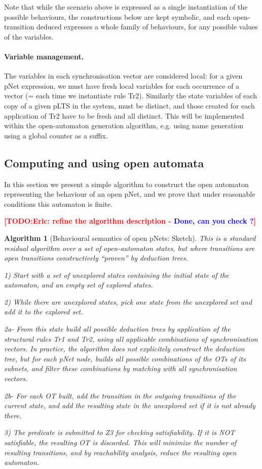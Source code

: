 \documentclass{lncs/llncs}
\newcommand{\TODO}[1]{\textcolor{red}{\textbf{[TODO:#1]}}}
\newcommand{\ERIC}[1]{\textcolor{blue}{#1}}
\newtheorem{algorithm}[theorem]{Algorithm}
\begin{document}
Note that while the scenario above is expressed as a single
instantiation of the possible behaviours, the constructions below are
kept symbolic, and each open-transition deduced expresses a whole family of
behaviours, for any possible values of the variables.

\paragraph{Variable management.}
The variables in each synchronisation vector are considered local:
for a given pNet expression, we must have fresh local variables for
each occurrence of a vector (= each time we instantiate rule
Tr2). Similarly the state variables of each copy of a
given pLTS in the system, must be distinct, and those created for each
application of Tr2 have to be fresh and all distinct. 
This will be implemented within the open-automaton generation algorithm,
e.g. using name generation using a global counter as a suffix.



\subsection{Computing and using open automata}
In this section we present a simple algorithm to construct the open
automaton representing the behaviour of an open pNet, and we prove that
under reasonable conditions this automaton is finite.

\TODO{Eric: refine the algorithm description - \ERIC{Done, can you check ?}}

\begin{algorithm}[Behavioural semantics of open pNets: Sketch]
This is a standard residual algorithm over a set of open-automaton
states, but where transitions are open transitions
constructively ``proven'' by deduction trees.

1) Start with a set of unexplored states containing the initial state
of the automaton, and an empty set of explored states.

2) While there are unexplored states, pick one state from the
unexplored set and add it to the explored set.

2a- From this state
build all possible deduction trees by application of the structural
rules Tr1 and Tr2, using all applicable combinations
of synchronisation vectors.
In practice, the algorithm does not explicitely construct the
deduction tree, but for each pNet node, builds all possible
combinations of the OTs of its subnets, and filter these combinations
by matching with all synchronisation vectors. 
 
2b- For each OT built, add the transition in the
outgoing transitions of the current state, and add the
resulting state in the unexplored set if it is not already there.

3) The predicate is submitted to Z3 for checking satisfiability. If it
is NOT satisfiable, the resulting OT is discarded. This will minimize
the number of resulting transitions, and by reachability analysis,
reduce the resulting open automaton.

\end{algorithm}
\end{document}
